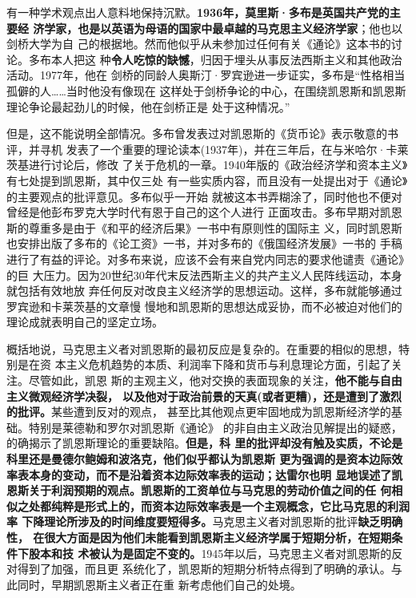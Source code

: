 有一种学术观点出人意料地保持沉默。\textbf{1936年，莫里斯·多布是英国共产党的主要经
  济学家，也是以英语为母语的国家中最卓越的马克思主义经济学家}；他也以剑桥大学为自
己的根据地。然而他似乎从未参加过任何有关《通论》这本书的讨论。多布本人把这
种\textbf{令人吃惊的缺憾}，归因于埋头从事反法西斯主义和其他政治活动。1977年，他在
剑桥的同龄人奥斯汀·罗宾逊进一步证实，多布是“性格相当孤僻的人……当时他没有像现在
这样处于剑桥争论的中心，在围绕凯恩斯和凯恩斯理论争论最起劲儿的时候，他在剑桥正是
处于这种情况。”

但是，这不能说明全部情况。多布曾发表过对凯恩斯的《货币论》表示敬意的书评，并寻机
发表了一个重要的理论读本(1937年)，并在三年后，在与米哈尔·卡莱茨基进行讨论后，修改
了关于危机的一章。1940年版的《政治经济学和资本主义》有七处提到凯恩斯，其中仅三处
有一些实质内容，而且没有一处提出对于《通论》的主要观点的批评意见。多布似乎一开始
就被这本书弄糊涂了，同时他也不便对曾经是他彭布罗克大学时代有恩于自己的这个人进行
正面攻击。多布早期对凯恩斯的尊重多是由于《和平的经济后果》一书中有原则性的国际主
义，同时凯恩斯也安排出版了多布的《论工资》一书，并对多布的《俄国经济发展》一书的
手稿进行了有益的评论。对多布来说，应该不会有来自党内同志的要求他谴责《通论》的巨
大压力。因为20世纪30年代末反法西斯主义的共产主义人民阵线运动，本身就包括有效地放
弃任何反对改良主义经济学的思想运动。这样，多布就能够通过罗宾逊和卡莱茨基的文章慢
慢地和凯恩斯的思想达成妥协，而不必被迫对他们的理论成就表明自己的坚定立场。

概括地说，马克思主义者对凯恩斯的最初反应是复杂的。在重要的相似的思想，特别是在资
本主义危机趋势的本质、利润率下降和货币与利息理论方面，引起了关注。尽管如此，凯恩
斯的主观主义，他对交换的表面现象的关注，\textbf{他不能与自由主义微观经济学决裂，
  以及他对于政治前景的天真(或者更糟)，还是遭到了激烈的批评。}某些遭到反对的观点，
甚至比其他观点更牢固地成为凯恩斯经济学的基础。特别是莱德勒和罗尔对凯恩斯《通论》
的非自由主义政治见解提出的疑惑，的确揭示了凯恩斯理论的重要缺陷。\textbf{但是，科
  里的批评却没有触及实质，不论是科里还是曼德尔鲍姆和波洛克，他们似乎都认为凯恩斯
  更为强调的是资本边际效率表本身的变动，而不是沿着资本边际效率表的运动；达雷尔也明
  显地误述了凯恩斯关于利润预期的观点。凯恩斯的工资单位与马克思的劳动价值之间的任
  何相似之处都纯粹是形式上的，而资本边际效率表是一个主观概念，它比马克思的利润率
  下降理论所涉及的时间维度要短得多。}马克思主义者对凯恩斯的批评\textbf{缺乏明确性，
  在很大方面是因为他们未能看到凯恩斯主义经济学属于短期分析，在短期条件下股本和技
  术被认为是固定不变的。}1945年以后，马克思主义者对凯恩斯的反对得到了加强，而且更
系统化了，凯恩斯的短期分析特点得到了明确的承认。与此同时，早期凯恩斯主义者正在重
新考虑他们自己的处境。

